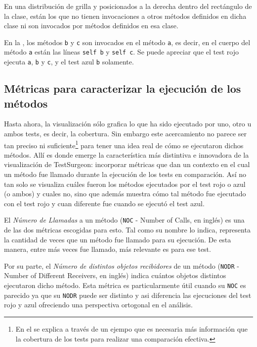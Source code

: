 \par En una distribución de grilla y posicionados a la derecha dentro del rectángulo de la clase, están los que no tienen invocaciones a otros métodos definidos en dicha clase ni son invocados por métodos definidos en esa clase.


\par En la , los métodos {\tt b} y {\tt c} son invocados en el método {\tt a}, es decir, en el cuerpo del método {\tt a} están las líneas {\tt self b} y {\tt self c}. Se puede apreciar que el test rojo ejecuta {\tt a}, {\tt b} y {\tt c}, y el test azul {\tt b} solamente. 

\subsection{Métricas para caracterizar la ejecución de los métodos }

\par Hasta ahora, la visualización sólo grafica lo que ha sido ejecutado por uno, otro u ambos tests, es decir, la cobertura. Sin embargo este acercamiento no parece ser tan preciso ni suficiente\footnote{En el  se explica a través de un ejempo que es necesaria más información que la cobertura de los tests para realizar una comparación efectiva.} para tener una idea real de cómo se ejecutaron dichos métodos. Allí es donde emerge la característica más distintiva e innovadora de la visualización de TestSurgeon: incorporar métricas que dan un contexto en el cual un método fue llamado durante la ejecución de los tests en comparación. Así no tan solo se visualiza cuáles fueron los métodos ejecutados por el test rojo o azul (o ambos) y cuales no, sino que además muestra cómo tal método fue ejecutado con el test rojo y cuan diferente fue cuando se ejecutó el test azul.

\par El \emph{Número de Llamadas} a un método ({\tt NOC} - Number of Calls, en inglés) es una de las dos métricas escogidas para esto. Tal como su nombre lo indica, representa la cantidad de veces que un método fue llamado para su ejecución. De esta manera, entre más veces fue llamado, más relevante es para ese test.

\par Por su parte, el \emph{Número de distintos objetos recibidores} de un método ({\tt NODR} - Number of Different Receivers, en inglés) indica cuántos objetos distintos ejecutaron dicho método. Esta métrica es particularmente útil cuando su {\tt NOC} es parecido ya que su {\tt NODR} puede ser distinto y asi diferencia las ejecuciones del test rojo y azul ofreciendo una perspectiva ortogonal en el análisis.

